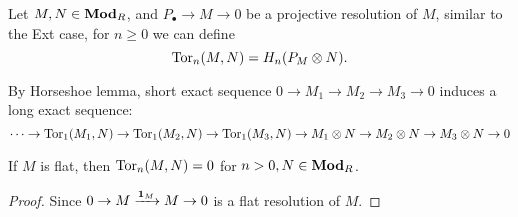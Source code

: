 \begin{definition}
  Let $M, N \in \mathbf{Mod}_R$, and $P_\bullet \to M \to 0$ be a projective resolution of $M$, 
  similar to the Ext case, for $n \ge 0$ we can define
  $$\operatorname{Tor}_n(M, N) = H_n(P_M \otimes N).$$
\end{definition}

\begin{fact}
  By Horseshoe lemma, short exact sequence $0 \to M_1 \to M_2 \to M_3 \to 0$
  induces a long exact sequence:
  $$\cdots \to \operatorname{Tor}_1(M_1, N) \to \operatorname{Tor}_1(M_2, N) \to \operatorname{Tor}_1(M_3, N) \to 
  M_1 \otimes N \to M_2 \otimes N \to M_3 \otimes N \to 0$$
\end{fact}

\begin{prop}
  If $M$ is flat, then $\operatorname{Tor}_n(M, N) = 0$ for $n > 0, N \in \mathbf{Mod}_R$.
  \begin{proof}
    Since $0 \to M \xrightarrow{\mathbf{1}_M} M \to 0$ is a flat resolution of $M$. 
  \end{proof}
\end{prop}

